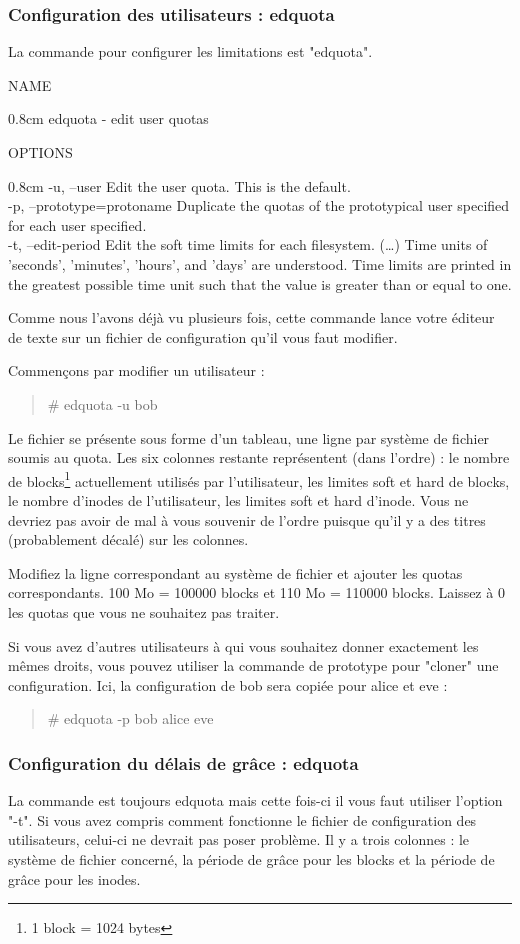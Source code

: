 \documentclass[a4paper,11pt]{article}
\newcommand{\commande}[1] {
    \begin{quote}
    \tt\raggedright #1 
    \end{quote}
}
\newcommand{\man}[2]{
    \begin{tcolorbox}[toprule=3mm,width=\textwidth,outer arc=0mm,colbacktitle=grayman,coltitle=black,colback={grayman},colframe={grayman},title={man : \tt #1}]
        \tt\raggedright #2
    \end{tcolorbox}
}
\newcommand{\mandesc}[1]{
    \begin{adjustwidth}{0.8cm}{}
        #1
    \end{adjustwidth}
}
\begin{document}
\subsubsection{Configuration des utilisateurs : edquota}
\par La commande pour configurer les limitations est "edquota".
\man{edquota}{NAME
\mandesc{edquota - edit user quotas}
OPTIONS
\mandesc{-u, --user Edit the user quota. This is the default.\\
-p, --prototype=protoname Duplicate the quotas of the prototypical user specified for each user specified.\\
-t, --edit-period
              Edit  the  soft time limits for each filesystem.  (\dots) Time units of 'seconds', 'minutes', 'hours', and 'days' are understood. Time limits are printed in the greatest possible  time  unit  such that the value is greater than or equal to one.
}}
\par Comme nous l'avons déjà vu plusieurs fois, cette commande lance votre éditeur de texte sur un fichier de configuration qu'il vous faut modifier.
\par Commençons par modifier un utilisateur :
\commande{\# edquota -u bob}
\par Le fichier se présente sous forme d'un tableau, une ligne par système de fichier soumis au quota. Les six colonnes restante représentent (dans l'ordre) : le nombre de blocks\footnote{1 block = 1024 bytes} actuellement utilisés par l'utilisateur, les limites soft et hard de blocks, le nombre d'inodes de l'utilisateur, les limites soft et hard d'inode. Vous ne devriez pas avoir de mal à vous souvenir de l'ordre puisque qu'il y a des titres (probablement décalé) sur les colonnes.
\par Modifiez la ligne correspondant au système de fichier et ajouter les quotas correspondants. 100 Mo = 100000 blocks et 110 Mo = 110000 blocks. Laissez à 0 les quotas que vous ne souhaitez pas traiter.
\par Si vous avez d'autres utilisateurs à qui vous souhaitez donner exactement les mêmes droits, vous pouvez utiliser la commande de prototype pour "cloner" une configuration. Ici, la configuration de bob sera copiée pour alice et eve :
\commande{\# edquota -p bob alice eve}

\subsubsection{Configuration du délais de grâce : edquota}
\par La commande est toujours edquota mais cette fois-ci il vous faut utiliser l'option "-t". Si vous avez compris comment fonctionne le fichier de configuration des utilisateurs, celui-ci ne devrait pas poser problème. Il y a trois colonnes : le système de fichier concerné, la période de grâce pour les blocks et la période de grâce pour les inodes.
\end{document}
